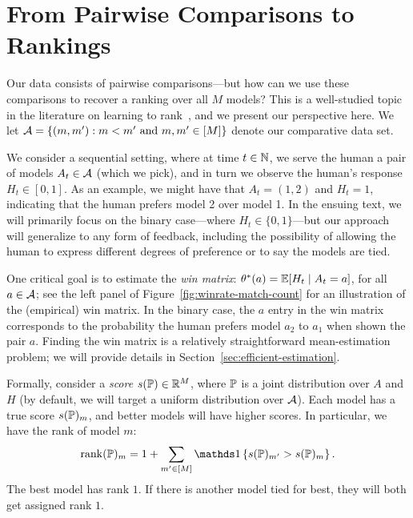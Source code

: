\documentclass{article}
\begin{document}

\section{From Pairwise Comparisons to Rankings}
\label{sec:rankings}

Our data consists of pairwise comparisons---but how can we use these comparisons to recover a ranking over all $M$ models?
This is a well-studied topic in the literature on learning to rank~\cite{liu2009learning}, and we present our perspective here.
We let $\cA = \{ (m, m') : m < m' \text{ and } m,m' \in [M] \}$ denote our comparative data set.

We consider a sequential setting, where at time $t \in \N$, we serve the human a pair of models $A_t \in \cA$ (which we pick), and in turn we observe the human's response $H_t \in [0,1]$.
As an example, we might have that $A_t = (1,2)$ and $H_t = 1$, indicating that the human prefers model 2 over model 1.
In the ensuing text, we will primarily focus on the binary case---where $H_t \in \{0, 1\}$---but our approach will generalize to any form of feedback, including the possibility of allowing the human to express different degrees of preference or to say the models are tied. 

One critical goal is to estimate the \emph{win matrix}: $\theta^*(a) = \E[H_t \mid A_t = a]$, for all $a \in \cA$; see the left panel of Figure~\ref{fig:winrate-match-count} for an illustration of the (empirical) win matrix.
In the binary case, the $a$ entry in the win matrix corresponds to the probability the human prefers model $a_2$ to $a_1$ when shown the pair $a$.
Finding the win matrix is a relatively straightforward mean-estimation problem; we will provide details in Section~\ref{sec:efficient-estimation}.

Formally, consider a \emph{score} $s(\P) \in \R^M$, where $\P$ is a joint distribution over $A$ and $H$ (by default, we will target a uniform distribution over $\cA$).
Each model has a true score $s(\P)_m$, and better models will have higher scores.
In particular, we have the rank of model $m$: 
\begin{equation}
    \rank(\P)_m = 1+\sum\limits_{m' \in [M]} \ind{s(\P)_{m'} > s(\P)_m}.
\end{equation}
The best model has rank $1$. 
If there is another model tied for best, they will both get assigned rank $1$.
\end{document}
